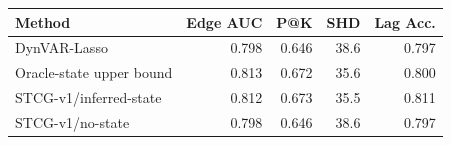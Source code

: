 \begin{tabular}{lrrrr}
\toprule
Method & Edge AUC & P@K & SHD & Lag Acc. \\
\midrule
DynVAR-Lasso & 0.798 & 0.646 & 38.6 & 0.797 \\
Oracle-state upper bound & 0.813 & 0.672 & 35.6 & 0.800 \\
STCG-v1/inferred-state & 0.812 & 0.673 & 35.5 & 0.811 \\
STCG-v1/no-state & 0.798 & 0.646 & 38.6 & 0.797 \\
\bottomrule
\end{tabular}
